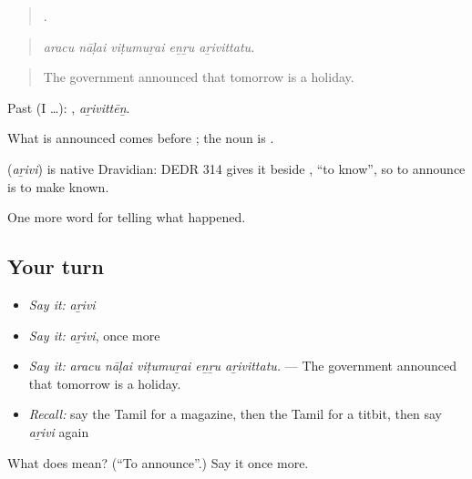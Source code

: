 \begin{quote}
    .
\end{quote}

\begin{quote}
\emph{aracu nāḷai viṭumuṟai eṉṟu aṟivittatu.}
\end{quote}

\begin{quote}
The government announced that tomorrow is a holiday.
\end{quote}

Past (I …): , \emph{aṟivittēṉ}.

What is announced comes before ; the noun is .

\begin{cousinweb}
\textbf{} (\emph{aṟivi}) is native Dravidian: DEDR 314 gives it beside , \textquotedblleft{}to know\textquotedblright{}, so to announce is to make known.
\end{cousinweb}

\begin{grammarlens}[title={What you've built}]
One more word for telling what happened.
\end{grammarlens}

\subsection*{Your turn}
\begin{itemize}
\raggedright
  \item \emph{Say it:} \emph{aṟivi}
  \item \emph{Say it:} \emph{aṟivi}, once more
  \item \emph{Say it:} \emph{aracu nāḷai viṭumuṟai eṉṟu aṟivittatu.} — The government announced that tomorrow is a holiday.
  \item \emph{Recall:} say the Tamil for a magazine, then the Tamil for a titbit, then say \emph{aṟivi} again
\end{itemize}

\begin{tcolorbox}[breakable,colback=teal!4,colframe=teal!35!black,title={Before you move on}]
What does  mean? (\textquotedblleft{}To announce\textquotedblright{}.) Say it once more.
\end{tcolorbox}
